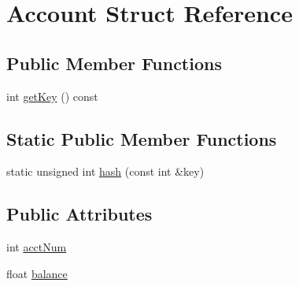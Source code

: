 \hypertarget{struct_account}{\section{\-Account \-Struct \-Reference}
\label{struct_account}
}
\subsection*{\-Public \-Member \-Functions}
\begin{DoxyCompactItemize}
\item 
int \hyperlink{struct_account_a799fdb1580f800ef7fba220c0dfa9ed9}{get\-Key} () const 
\end{DoxyCompactItemize}
\subsection*{\-Static \-Public \-Member \-Functions}
\begin{DoxyCompactItemize}
\item 
static unsigned int \hyperlink{struct_account_a05ec48bb7b69a8e39a2f66077fb5f0e5}{hash} (const int \&key)
\end{DoxyCompactItemize}
\subsection*{\-Public \-Attributes}
\begin{DoxyCompactItemize}
\item 
int \hyperlink{struct_account_a28c251b009a021f846b5c1a612142c3a}{acct\-Num}
\item 
float \hyperlink{struct_account_a3acb87e14fe08776a714037637f248f7}{balance}
\end{DoxyCompactItemize}


